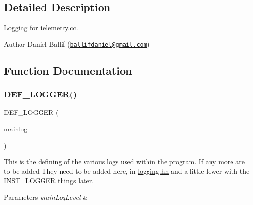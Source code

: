 \subsection{Detailed Description}
Logging for \hyperlink{telemetry_8cc}{telemetry.\+cc}. 

\begin{DoxyAuthor}{Author}
Daniel Ballif (\href{mailto:ballifdaniel@gmail.com}{\tt ballifdaniel@gmail.\+com}) 
\end{DoxyAuthor}


\subsection{Function Documentation}
\mbox{\label{logging_8hh_a25d3e12aaecd618c1176145894d5fb5a}} 
\subsubsection{\texorpdfstring{D\+E\+F\+\_\+\+L\+O\+G\+G\+E\+R()}{DEF\_LOGGER()}}
{\footnotesize\ttfamily D\+E\+F\+\_\+\+L\+O\+G\+G\+ER (\begin{DoxyParamCaption}\item[{mainlog}]{ }\end{DoxyParamCaption})}



This is the defining of the various logs used within the program. If any more are to be added They need to be added here, in \hyperlink{logging_8hh}{logging.\+hh} and a little lower with the I\+N\+S\+T\+\_\+\+L\+O\+G\+G\+ER things later. 


\begin{DoxyParams}{Parameters}
{\em main\+Log\+Level} & \\
\hline
\end{DoxyParams}

